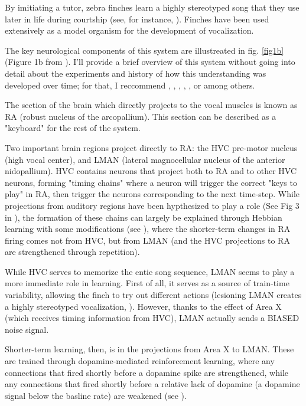 \documentclass[aps,prl,preprint,groupedaddress]{revtex4-1}
\begin{document}
By imitiating a tutor, zebra finches learn a highly stereotyped song that they use later in life during courtship (see, for instance, \cite{nifmem}).
Finches have been used extensively as a model organism for the development of vocalization. 

The key neurological components of this system are illustreated in fig. \ref{fig1b} (Figure 1b from \cite{hvcchains}). 
I'll provide a brief overview of this system without going into detail 
about the experiments and history of how this understanding was developed over time; for that, I reccommend 
\cite{lman}, \cite{hvcchains}, \cite{dopamine}, \cite{jesseactorcritic}, \cite{nifmem}, or \cite{hvcmem}  among others.

The section of the brain which directly projects to the vocal muscles is known as RA (robust nucleus of the arcopallium). 
This section can be described as a "keyboard" for the rest of the system.

Two important brain regions project directly to RA: the HVC pre-motor nucleus (high vocal center), and 
LMAN (lateral magnocellular nucleus of the anterior nidopallium). 
HVC contains neurons that project both to RA and to other HVC neurons, forming "timing chains" where a neuron will 
trigger the correct "keys to play" in RA, then trigger the neurons corresponding to the next time-step. 
While projections from auditory regions have been hypthesized to play a role (See Fig $3$ in \cite{hvcchains}), 
the formation of these chains can largely be explained through Hebbian learning with some modifications (see \cite{hvcchains}), 
where the shorter-term changes in RA firing comes not from HVC, but from LMAN 
(and the HVC projections to RA are strengthened through repetition).

While HVC serves to memorize the entie song sequence, LMAN seems to play a more immediate role in learning. 
First of all, it serves as a source of train-time variability, allowing the finch to try out different actions 
(lesioning LMAN creates a highly stereotyped vocalization, \cite{lman}). 
However, thanks to the effect of Area X (which receives timing information from HVC), LMAN actually sends a BIASED noise signal.

Shorter-term learning, then, is in the projections from Area X to LMAN. 
These are trained through dopamine-mediated reinforcement learning, 
where any connections that fired shortly before a dopamine spike are strengthened, 
while any connections that fired shortly before a relative lack of dopamine 
(a dopamine signal below the basline rate) are weakened (see \cite{dopamine}).
\end{document}
